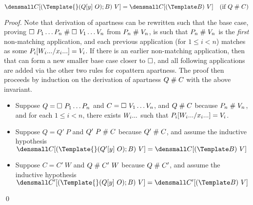 \begin{lemma}
  \label{thm:context-apart}
  \\
  $\den{C[(\Template{} (Q[y] ~ O); B) ~ V]} = \den{C[(\Template B) ~ V]}
  \quad (\text{if } Q \apart C)$
\end{lemma}
\begin{proof}
  Note that derivation of apartness can be rewritten such that the base case, proving $\hole ~ P_1 \dots P_n \apart \hole ~ V_1 \dots V_n$ from $P_n \apart V_n$, is such that $P_n \apart V_n$ is the \emph{first} non-matching application, and each previous application (for $1 \leq i < n$) matches as some $P_i\subst{\many{x_i}}{\many{W_i}} = V_i$.
  If there is an earlier non-matching application, then that can form a new smaller base case closer to $\hole$, and all following applications are added via the other two rules for copattern apartness.
  The proof then proceeds by induction on the derivation of apartness $Q \apart C$ with the above invariant.
  \begin{itemize}
  \item Suppose $Q = \hole ~ P_1 \dots P_n$ and $C = \hole ~ V_1 \dots V_n$, and $Q \apart C$ because $P_n \apart V_n$, and for each $1 \leq i < n$, there exists $\many{W_i}$ such that $P_i\subst{\many{x_i}}{\many{W_i}} = V_i$.
  \item Suppose $Q = Q' ~ P$ and $Q' ~ P \apart C$ because $Q' \apart C$, and assume the inductive hypothesis
    \begin{math}
      \den{C[(\Template{} (Q'[y] ~ O); B) ~ V]} = \den{C[(\Template B) ~ V]}
    \end{math}
  \item Suppose $C = C' ~ W$ and $Q \apart C' ~ W$ because $Q \apart C'$, and assume the inductive hypothesis
    \begin{math}
      \den{C'[(\Template{} (Q[y] ~ O); B) ~ V]} = \den{C'[(\Template B) ~ V]}
    \end{math}
  \end{itemize}
  \qed
\end{proof}


